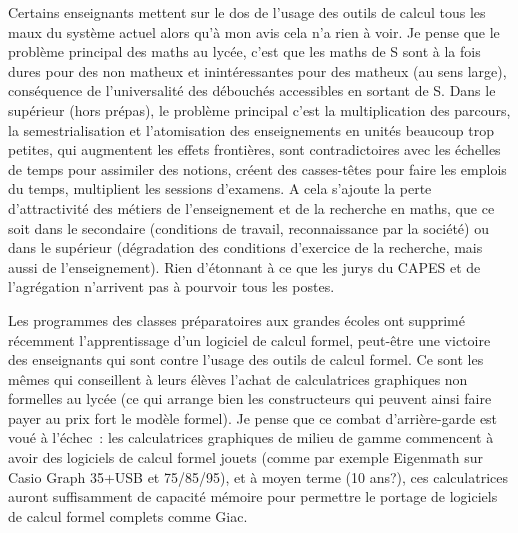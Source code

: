 \documentclass[a4paper,11pt]{article}
\begin{document}
\begin{giacjshere}
Certains enseignants mettent sur le dos de l'usage des outils de
calcul tous les maux du syst\`eme actuel alors qu'\`a mon avis cela n'a rien
\`a voir. Je pense que le probl\`eme principal des maths au lyc\'ee, 
c'est que les maths de S sont \`a la fois dures pour des non matheux
et inint\'eressantes pour des matheux (au sens large), cons\'equence
de l'universalit\'e des d\'ebouch\'es accessibles en sortant de S.
Dans le sup\'erieur (hors pr\'epas), le probl\`eme principal c'est
la multiplication des parcours, la semestrialisation 
et l'atomisation des enseignements
en unit\'es beaucoup trop petites, qui augmentent les effets
fronti\`eres, sont contradictoires avec les \'echelles de temps
pour assimiler des notions, cr\'eent des casses-t\^etes pour faire
les emplois du temps, multiplient les sessions d'examens. 
A cela s'ajoute la perte d'attractivit\'e des m\'etiers de
l'enseignement et de la recherche en maths, que ce soit
dans le secondaire (conditions de travail, reconnaissance
par la soci\'et\'e) ou dans le sup\'erieur (d\'egradation
des conditions d'exercice de la recherche, mais aussi
de l'enseignement). Rien d'\'etonnant \`a ce que les jurys
du CAPES et de l'agr\'egation n'arrivent pas \`a
pourvoir tous les postes.

Les programmes des classes pr\'eparatoires aux grandes \'ecoles
ont supprim\'e r\'ecemment l'apprentissage d'un logiciel de calcul
formel, peut-\^etre une victoire des enseignants qui sont contre
l'usage des outils de calcul formel. Ce sont les m\^emes qui conseillent
\`a leurs \'el\`eves l'achat de calculatrices graphiques non formelles
au lyc\'ee (ce qui arrange bien les constructeurs qui peuvent ainsi
faire payer au prix fort le mod\`ele formel). 
Je pense que ce combat d'arri\`ere-garde est vou\'e \`a l'\'echec~:
les calculatrices graphiques de milieu de gamme commencent
\`a avoir des logiciels de calcul formel jouets (comme
par exemple Eigenmath sur Casio Graph 35+USB et 75/85/95),
et \`a moyen terme (10 ans?), ces calculatrices 
auront suffisamment de capacit\'e m\'emoire pour
permettre le portage de logiciels de calcul formel complets comme Giac.


\end{giacjshere}
\end{document}
